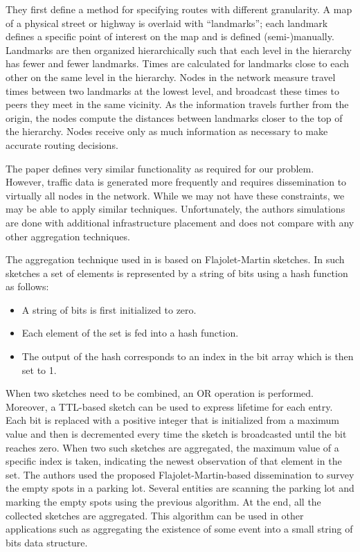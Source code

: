 \documentclass{IEEEtran}
\begin{document}
They first define a method for specifying routes with different granularity. A map of a physical street or highway is overlaid with “landmarks”; each landmark defines a specific point of interest on the map and is defined (semi-)manually. Landmarks are then organized hierarchically such that each level in the hierarchy has fewer and fewer landmarks.
Times are calculated for landmarks close to each other on the same level in the hierarchy. Nodes in the network measure travel times between two landmarks at the lowest level, and broadcast these times to peers they meet in the same vicinity. As the information travels further from the origin, the nodes compute the distances between landmarks closer to the top of the hierarchy.  Nodes receive only as much information as necessary to make accurate routing decisions.

The \cite{landmark} paper defines very similar functionality as required for our problem. However, traffic data is generated more frequently and requires dissemination to virtually all nodes in the network. While we may not have these constraints, we may be able to apply similar techniques. Unfortunately, the authors simulations are done with additional infrastructure placement and does not compare with any other aggregation techniques.

The aggregation technique used in \cite{prob_agg} is based on Flajolet-Martin sketches. In such sketches a set of elements is represented by a string of bits using a hash function as follows:

\begin{itemize}
\item A string of bits is first initialized to zero.
\item Each element of the set is fed into a hash function.
\item The output of the hash corresponds to an index in the bit array which is then set to 1.
\end{itemize}

When two sketches need to be combined, an OR operation is performed. Moreover, a TTL-based sketch can be used to express lifetime for each entry. Each bit is replaced with a positive integer that is initialized from a maximum value and then is decremented every time the sketch is broadcasted until the bit reaches zero. When two such sketches are aggregated, the maximum value of a specific index is taken, indicating the newest observation of that element in the set.
The authors used the proposed Flajolet-Martin-based dissemination to survey the empty spots in a parking lot. Several entities are scanning the parking lot and marking the empty spots using the previous algorithm. At the end, all the collected sketches are aggregated. This algorithm can be used in other applications such as aggregating the existence of some event into a small string of bits data structure.
\end{document}
